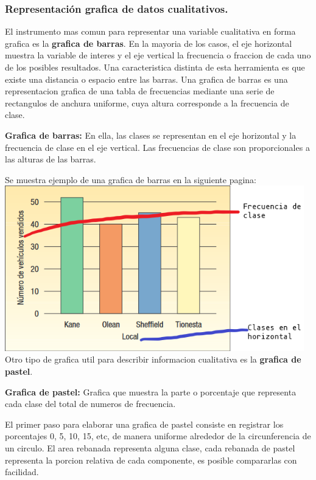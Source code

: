 \documentclass[]{article}
\begin{document}
\subsubsection*{Representación grafica de datos cualitativos.}
El instrumento mas comun para representar una variable cualitativa en forma grafica es la \textbf{grafica de barras}. En la mayoria de los casos, el eje horizontal muestra la variable de interes y el eje vertical la frecuencia o fraccion de cada uno de los posibles resultados. Una caracteristica distinta de esta herramienta es que existe una distancia o espacio entre las barras. Una grafica de barras es una representacion grafica de una tabla de frecuencias mediante una serie de rectangulos de anchura uniforme, cuya altura corresponde a la frecuencia de clase.
\begin{center}
	\textbf{Grafica de barras:} En ella, las clases se representan en el eje horizontal y la frecuencia de clase en el eje vertical. Las frecuencias de clase son proporcionales a las alturas de las barras.
\end{center}
Se muestra ejemplo de una grafica de barras en la siguiente pagina:\\
\includegraphics[width=13cm]{graficaBarras2_1.png} \\
Otro tipo de grafica util para describir informacion cualitativa es la \textbf{grafica de pastel}.
\begin{center}
	\textbf{Grafica de pastel: }Grafica que muestra la parte o porcentaje que representa cada clase del total de numeros de frecuencia.
\end{center}
El primer paso para elaborar una grafica de pastel consiste en registrar los porcentajes 0, 5, 10, 15, etc, de manera uniforme alrededor de la circunferencia de un circulo. El area rebanada representa alguna clase, cada rebanada de pastel representa la  porcion relativa de cada componente, es posible compararlas con facilidad.\\
\end{document}
